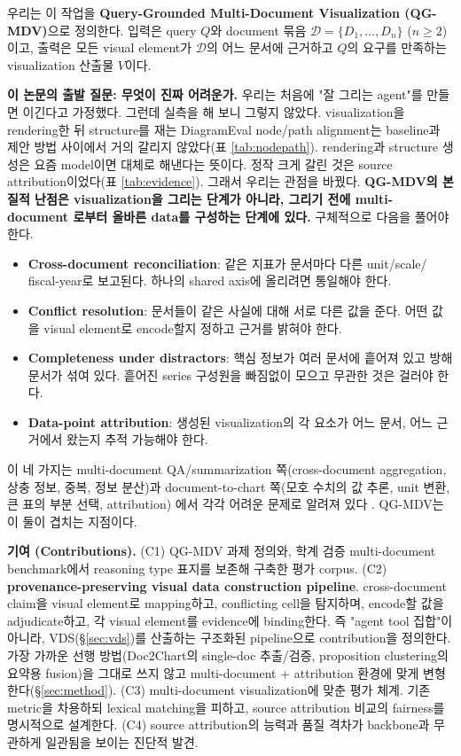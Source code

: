 \documentclass[11pt]{article}
\begin{document}
우리는 이 작업을 \textbf{Query-Grounded Multi-Document Visualization (QG-MDV)}으로 정의한다.
입력은 query $Q$와 document 묶음 $\mathcal{D}=\{D_1,\dots,D_n\}$ ($n\geq 2$)이고, 출력은 모든
visual element가 $\mathcal{D}$의 어느 문서에 근거하고 $Q$의 요구를 만족하는 visualization
산출물 $V$이다.

\textbf{이 논문의 출발 질문: 무엇이 진짜 어려운가.} 우리는 처음에 "잘 그리는 agent"를 만들면
이긴다고 가정했다. 그런데 실측을 해 보니 그렇지 않았다. visualization을 rendering한 뒤 structure를
재는 DiagramEval node/path alignment는 baseline과 제안 방법 사이에서 거의 갈리지 않았다(표
\ref{tab:nodepath}). rendering과 structure 생성은 요즘 model이면 대체로 해낸다는 뜻이다. 정작
크게 갈린 것은 source attribution이었다(표 \ref{tab:evidence}). 그래서 우리는 관점을 바꿨다.
\textbf{QG-MDV의 본질적 난점은 visualization을 그리는 단계가 아니라, 그리기 전에 multi-document
로부터 올바른 data를 구성하는 단계에 있다.} 구체적으로 다음을 풀어야 한다.

\begin{itemize}[leftmargin=*]
    \item \textbf{Cross-document reconciliation}: 같은 지표가 문서마다 다른 unit/scale/
    fiscal-year로 보고된다. 하나의 shared axis에 올리려면 통일해야 한다.
    \item \textbf{Conflict resolution}: 문서들이 같은 사실에 대해 서로 다른 값을 준다. 어떤
    값을 visual element로 encode할지 정하고 근거를 밝혀야 한다.
    \item \textbf{Completeness under distractors}: 핵심 정보가 여러 문서에 흩어져 있고 방해
    문서가 섞여 있다. 흩어진 series 구성원을 빠짐없이 모으고 무관한 것은 걸러야 한다.
    \item \textbf{Data-point attribution}: 생성된 visualization의 각 요소가 어느 문서, 어느
    근거에서 왔는지 추적 가능해야 한다.
\end{itemize}

이 네 가지는 multi-document QA/summarization 쪽(cross-document aggregation, 상충 정보, 중복,
정보 분산)과 document-to-chart 쪽(모호 수치의 값 추론, unit 변환, 큰 표의 부분 선택, attribution)
에서 각각 어려운 문제로 알려져 있다 \cite{tang2024multihoprag, wang2024loong, jain2025doc2chart,
zhao2024chartifytext}. QG-MDV는 이 둘이 겹치는 지점이다.

\textbf{기여 (Contributions).}
(C1) QG-MDV 과제 정의와, 학계 검증 multi-document benchmark에서 reasoning type 표지를 보존해
구축한 평가 corpus.
(C2) \textbf{provenance-preserving visual data construction pipeline}. cross-document claim을
visual element로 mapping하고, conflicting cell을 탐지하며, encode할 값을 adjudicate하고, 각
visual element를 evidence에 binding한다. 즉 "agent tool 집합"이 아니라, VDS(\S\ref{sec:vds})를
산출하는 구조화된 pipeline으로 contribution을 정의한다. 가장 가까운 선행 방법(Doc2Chart의
single-doc 추출/검증, proposition clustering의 요약용 fusion)을 그대로 쓰지 않고 multi-document
+ attribution 환경에 맞게 변형한다(\S\ref{sec:method}).
(C3) multi-document visualization에 맞춘 평가 체계. 기존 metric을 차용하되 lexical matching을
피하고, source attribution 비교의 fairness를 명시적으로 설계한다.
(C4) source attribution의 능력과 품질 격차가 backbone과 무관하게 일관됨을 보이는 진단적 발견.
\end{document}
